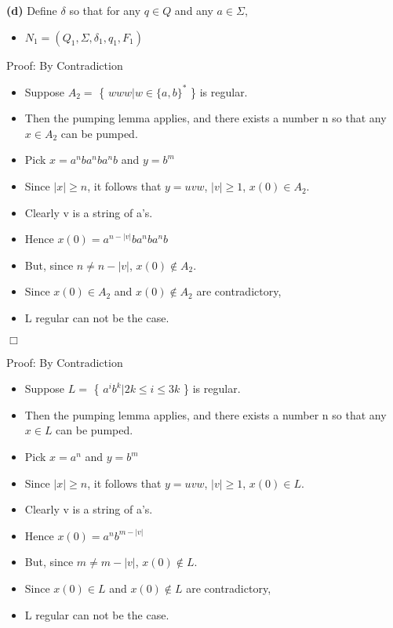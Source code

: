 \documentclass[11pt]{article}
\newcommand{\question}[2] {\vspace{.25in} \fbox{#1} #2 \vspace{.10in}}
\renewcommand{\part}[1] {\vspace{.10in} {\bf (#1)}}
\begin{document}
\part{d} Define $\delta$ so that for any $q \in Q$ and any $a \in \Sigma$, 
\begin{center}
  \begin{itemize}
    \item $N_1 = (Q_1,\Sigma,{\delta}_1,q_1, F_1) $
  \end{itemize}
\end{center}

\question{2}{Proof: By Contradiction}
\begin{center}
  \begin{itemize}
    \item Suppose $A_2 = $ \{ $ www | w \in \{a,b\}^* $ \}  is regular.
    \item Then the pumping lemma applies, and there exists a number n so that any $x \in A_2$ can be pumped.
    \item Pick $x = a^n b a^n b a^n b $ and $ y = b^m $
    \item Since $|x| \geq n$, it follows that $y = uvw$, $|v| \geq 1$, $x(0) \in A_2$. 
    \item Clearly v is a string of a's.
    \item Hence $x(0) = a^{n-|v|} b a^n b a^n b$
    \item But, since $n \ne  n-|v|$, $x(0) \notin A_2$.
    \item Since $x(0) \in A_2$ and $x(0) \notin A_2$ are contradictory,
    \item L regular can not be the case.
  \end{itemize}
\end{center}

\indent $\Box$

\pagebreak 

\question{3}{Proof: By Contradiction}
\begin{center}
  \begin{itemize}
    \item Suppose $L = $ \{ $a^i b^k | 2k \leq i \leq 3k $ \}  is regular.
    \item Then the pumping lemma applies, and there exists a number n so that any $x \in L$ can be pumped.
    \item Pick $x = a^n $ and $ y = b^m $
    \item Since $|x| \geq n$, it follows that $y = uvw$, $|v| \geq 1$, $x(0) \in L$. 
    \item Clearly v is a string of a's.
    \item Hence $x(0) = a^n b^{m-|v|}$
    \item But, since $m \ne  m-|v|$, $x(0) \notin L$.
    \item Since $x(0) \in L$ and $x(0) \notin L$ are contradictory,
    \item L regular can not be the case.
  \end{itemize}
\end{center}
\end{document}
